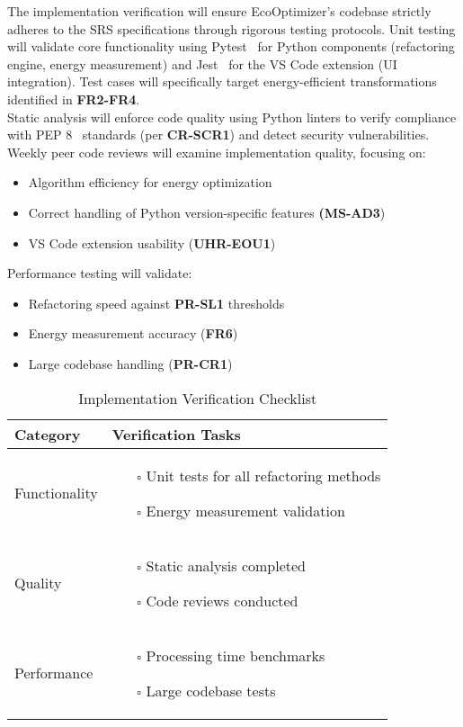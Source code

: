\documentclass[12pt, titlepage]{article}
\begin{document}
The implementation verification will ensure EcoOptimizer's codebase strictly adheres to the SRS specifications through rigorous testing protocols. Unit testing will validate core functionality using Pytest~\cite{pytest} for Python components (refactoring engine, energy measurement) and Jest~\cite{jest} for the VS Code extension (UI integration). Test cases will specifically target energy-efficient transformations identified in \textbf{FR2-FR4}.\\

\noindent Static analysis will enforce code quality using Python linters to verify compliance with PEP 8~\cite{pep8} standards (per \textbf{CR-SCR1}) and detect security vulnerabilities. Weekly peer code reviews will examine implementation quality, focusing on:
\begin{itemize}[nosep]
\item Algorithm efficiency for energy optimization
\item Correct handling of Python version-specific features \textbf{(MS-AD3})
\item VS Code extension usability (\textbf{UHR-EOU1})\\
\end{itemize}

\noindent Performance testing will validate:
\begin{itemize}[nosep]
\item Refactoring speed against \textbf{PR-SL1} thresholds
\item Energy measurement accuracy (\textbf{FR6})
\item Large codebase handling (\textbf{PR-CR1})
\end{itemize}

\begin{table}[h]
\centering
\caption{Implementation Verification Checklist}
\begin{tabular}{|p{}|p{}|}
\hline
\textbf{Category} & \textbf{Verification Tasks} \\ \hline
Functionality & \begin{itemize}
\item[$\square$] Unit tests for all refactoring methods
\item[$\square$] Energy measurement validation
\end{itemize} \\ \hline
Quality & \begin{itemize}
\item[$\square$] Static analysis completed
\item[$\square$] Code reviews conducted
\end{itemize} \\ \hline
Performance & \begin{itemize}
\item[$\square$] Processing time benchmarks
\item[$\square$] Large codebase tests
\end{itemize} \\ \hline
\end{tabular}
\end{table}
\end{document}

